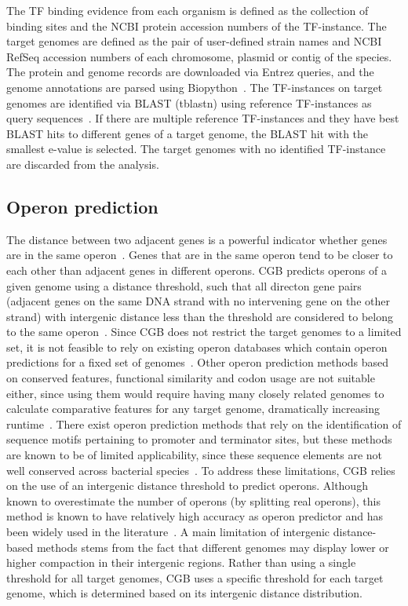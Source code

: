 The TF binding evidence from each organism is defined as the collection of
binding sites and the NCBI protein accession numbers of the TF-instance. The
target genomes are defined as the pair of user-defined strain names and NCBI
RefSeq accession numbers of each chromosome, plasmid or contig of the
species. The protein and genome records are downloaded via Entrez queries, and
the genome annotations are parsed using Biopython~\cite{wheeler2007database,
  cock2009biopython}. The TF-instances on target genomes are identified via
BLAST (tblastn) using reference TF-instances as query
sequences~\cite{altschul1990basic}. If there are multiple reference
TF-instances and they have best BLAST hits to different genes of a target
genome, the BLAST hit with the smallest e-value is selected. The target genomes
with no identified TF-instance are discarded from the analysis.

\subsection{Operon prediction}

The distance between two adjacent genes is a powerful indicator whether genes
are in the same operon~\cite{westover2005operon}. Genes that are in the same
operon tend to be closer to each other than adjacent genes in different
operons. CGB predicts operons of a given genome using a distance threshold,
such that all directon gene pairs (adjacent genes on the same DNA strand with
no intervening gene on the other strand) with intergenic distance less than the
threshold are considered to belong to the same operon~\cite{salgado2000operons,
  moreno2002powerful, price2005novel}. Since CGB does not restrict the target
genomes to a limited set, it is not feasible to rely on existing operon
databases which contain operon predictions for a fixed set of
genomes~\cite{mao2009door, taboada2012proopdb, pertea2009operondb}. Other
operon prediction methods based on conserved features, functional similarity
and codon usage are not suitable either, since using them would require having
many closely related genomes to calculate comparative features for any target
genome, dramatically increasing runtime~\cite{chuang2012features}. There exist
operon prediction methods that rely on the identification of sequence motifs
pertaining to promoter and terminator sites, but these methods are known to be
of limited applicability, since these sequence elements are not well conserved
across bacterial species~\cite{salgado2000operons, itoh1999evolutionary}. To
address these limitations, CGB relies on the use of an intergenic distance
threshold to predict operons. Although known to overestimate the number of
operons (by splitting real operons), this method is known to have relatively
high accuracy as operon predictor and has been widely
used in the literature~\cite{chuang2012features, westover2005operon}. A main
limitation of intergenic distance-based methods stems from the fact that
different genomes may display lower or higher compaction in their intergenic
regions. Rather than using a single
threshold for all target genomes, CGB uses a specific threshold for each target
genome, which is determined based on its intergenic distance distribution.

